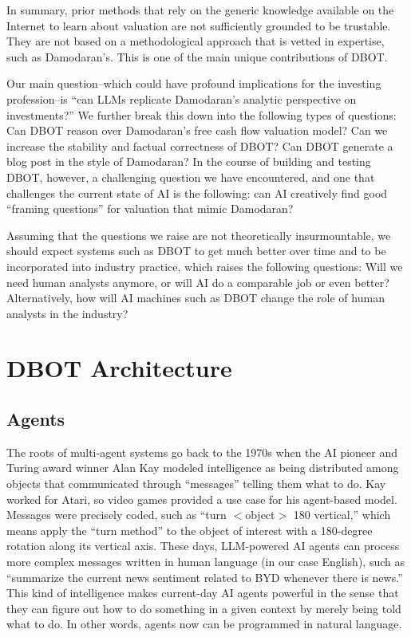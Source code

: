 \documentclass[]{interact}
\theoremstyle{plain}%
\theoremstyle{definition}
\theoremstyle{remark}
\begin{document}
In summary, prior methods that rely on the generic knowledge available on the Internet to learn about valuation are not sufficiently grounded to be trustable. They are not based on a methodological approach that is vetted in expertise, such as Damodaran’s. This is one of the main unique contributions of DBOT.

Our main question--which could have profound implications for the investing profession--is ``can LLMs replicate Damodaran's analytic perspective on investments?'' We further break this down into the following types of questions:  Can DBOT reason over Damodaran's free cash flow valuation model? 
Can we increase the stability and factual correctness of DBOT? Can DBOT generate a blog post in the style of Damodaran? In the course of building and testing DBOT, however, a challenging question we have encountered, and one that challenges the current state of AI is the following: can AI creatively find good ``framing questions'' for valuation that mimic Damodaran?


Assuming that the questions we raise are not theoretically insurmountable, we should expect systems such as DBOT to get much better over time and to be incorporated into industry practice, which raises the following questions: Will we need human analysts anymore, or will AI do a comparable job or even better? Alternatively, how will AI machines such as DBOT change the role of human analysts in the industry? 

\section{DBOT Architecture}

\subsection{Agents}

The roots of multi-agent systems go back to the 1970s when the AI pioneer and Turing award winner Alan Kay modeled intelligence as being distributed among objects that communicated through ``messages'' telling them what to do. Kay worked for Atari, so video games provided a use case for his agent-based model. Messages were precisely coded, such as ``turn $<$object$>$ 180 vertical,'' which means apply the ``turn method'' to the object of interest with a 180-degree rotation along its vertical axis. These days, LLM-powered AI agents can process more complex messages written in human language (in our case English), such as ``summarize the current news sentiment related to BYD whenever there is news.'' This kind of intelligence makes current-day AI agents powerful in the sense that they can figure out how to do something in a given context by merely being told what to do. In other words, agents now can be programmed in natural language.
\end{document}
